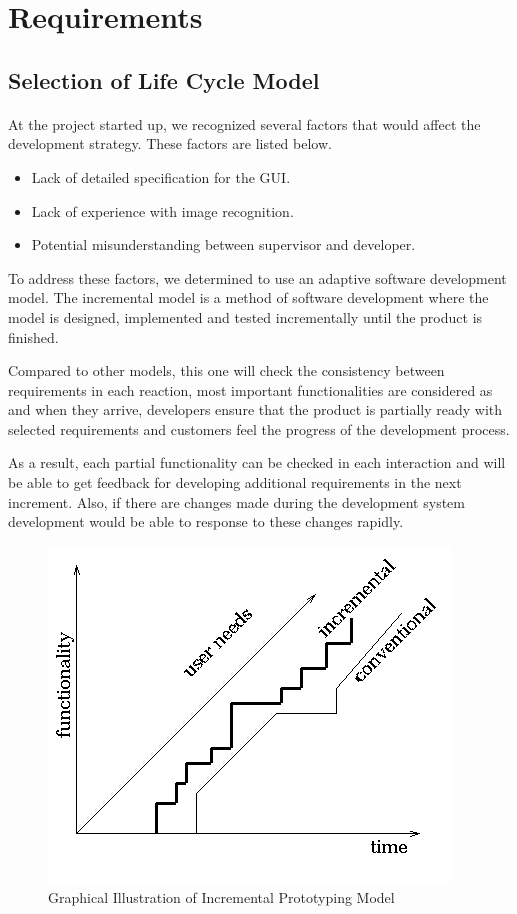 \section{Requirements}
\label{sec:Requirements}

\subsection{Selection of Life Cycle Model}
\paragraph{} At the project started up, we recognized several factors that would affect the development strategy. These factors are listed below.
\begin{itemize}
\item Lack of detailed specification for the GUI.
\item Lack of experience with image recognition.
\item Potential misunderstanding between supervisor and developer.
\end{itemize}
\par To address these factors, we determined to use an adaptive software development model. The incremental model is a method of software development where the model is designed, implemented and tested incrementally until the product is finished. 
\par Compared to other models, this one will check the consistency between requirements in each reaction, most important functionalities are considered as and when they arrive, developers ensure that the product is partially ready with selected requirements and customers feel the progress of the development process.
\par As a result, each partial functionality can be checked in each interaction and will be able to get feedback for developing additional requirements in the next increment. Also, if there are changes made during the development system development would be able to response to these changes rapidly.

\begin{figure}[htb]
\centering
\includegraphics[width=.5\textwidth]{section02/assets/IncrementalModel.png}
\caption[Short Caption 2]{\label{IncrmentalModel}Graphical Illustration of Incremental Prototyping Model}
\end{figure}

